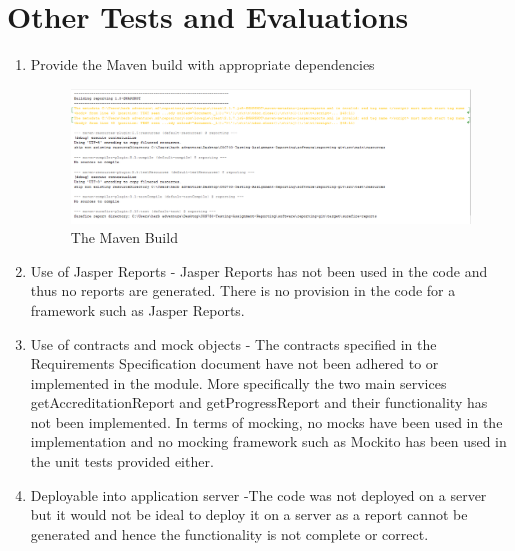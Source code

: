 \section{Other Tests and Evaluations}
 
\begin{enumerate}    
\item Provide the Maven build with appropriate dependencies
\begin{figure}[h!]
	\includegraphics[scale=0.6]{./figures/mavenBuild1.PNG}
	\caption{The Maven Build}
\end{figure} 
 
\item Use of Jasper Reports - Jasper Reports has not been used in the code and thus no reports are generated. There is no provision in the code for a framework such as Jasper Reports. 
\item Use of contracts and mock objects - The contracts specified in the Requirements Specification document have not been adhered to or implemented in the module. More specifically the two main services getAccreditationReport and getProgressReport and their functionality has not been implemented. In terms of mocking, no mocks have been used in the implementation and no mocking framework such as Mockito has been used in the unit tests provided either.
\item Deployable into application server -The code was not deployed on a server but it would not be ideal to deploy it on a server as a report cannot be generated and hence the functionality is not complete or correct.  
\end{enumerate}

